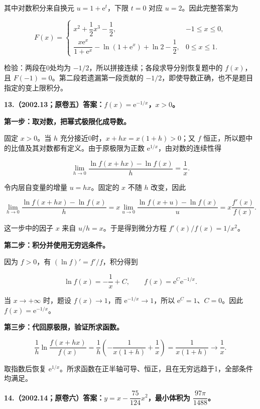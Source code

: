 \documentclass[UTF8,11pt,fontset=windows]{ctexart}
\begin{document}
其中对数积分来自换元 $u=1+\mathrm e^t$，下限 $t=0$ 对应 $u=2$。因此完整答案为

$$
\boxed{F(x)=\begin{cases}
x^2+\dfrac12x^3-\dfrac12,&-1\le x\le0,\\[6pt]
\dfrac{x\mathrm e^x}{1+\mathrm e^x}-\ln(1+\mathrm e^x)+\ln2-\dfrac12,&0\le x\le1.
\end{cases}}
$$

检验：两段在0处均为 $-1/2$，所以拼接连续；各段求导分别恢复题中的 $f(x)$，且 $F(-1)=0$。第二段若遗漏第一段贡献的 $-1/2$，即使导数正确，也不是题目指定的变上限积分。

\clearpage

\textbf{13.（2002.13；原卷五）答案：$f(x)=\mathrm e^{-1/x}$，$x>0$。}

\textbf{第一步：取对数，把幂式极限化成导数。}

固定 $x>0$。当 $h$ 充分接近0时，$x+hx=x(1+h)>0$；又 $f$ 恒正，所以题中的比值及其对数都有定义。由于原极限为正数 $\mathrm e^{1/x}$，由对数的连续性得

$$
\lim_{h\to0}\frac{\ln f(x+hx)-\ln f(x)}h=\frac1x.
$$

令内层自变量的增量 $u=hx$。固定的 $x$ 不随 $h$ 改变，因此

$$
\lim_{h\to0}\frac{\ln f(x+hx)-\ln f(x)}h
=x\lim_{u\to0}\frac{\ln f(x+u)-\ln f(x)}u
=x\frac{f'(x)}{f(x)}.
$$

这一步中的因子 $x$ 来自 $u/h=x$。于是得到微分方程 $f'(x)/f(x)=1/x^2$。

\textbf{第二步：积分并使用无穷远条件。}

因为 $f>0$，有 $(\ln f)'=f'/f$，积分得到

$$
\ln f(x)=-\frac1x+C,
\qquad f(x)=\mathrm e^C\mathrm e^{-1/x}.
$$

当 $x\to+\infty$ 时，题设 $f(x)\to1$，而 $\mathrm e^{-1/x}\to1$，所以 $\mathrm e^C=1$、$C=0$。因此 $\boxed{f(x)=\mathrm e^{-1/x}}$。

\textbf{第三步：代回原极限，验证所求函数。}

$$
\frac1h\ln\frac{f(x+hx)}{f(x)}
=\frac1h\left(-\frac1{x(1+h)}+\frac1x\right)
=\frac1{x(1+h)}\longrightarrow\frac1x.
$$

取指数后恢复 $\mathrm e^{1/x}$。所求函数在正半轴可导、恒正，且在无穷远趋于1，全部条件均满足。

\clearpage

\textbf{14.（2002.14；原卷六）答案：$y=x-\dfrac{75}{124}x^2$，最小体积为 $\dfrac{97\pi}{1488}$。}
\end{document}
